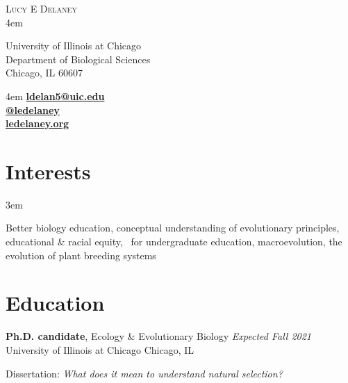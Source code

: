 \documentclass[]{article}
\begin{document}
\BgThispage
\pagestyle{alldocument}

{\fontsize{20}{64}\selectfont \textsc{Lucy E Delaney}}\\
\leftskip 4em
\begin{multicols}{2}

University of Illinois at Chicago\\
Department of Biological Sciences\\
Chicago, IL 60607

\columnbreak

\begin{flushright}
\rightskip 4em
\href{mailto:ldelan5@uic.edu}{\textbf{ldelan5@uic.edu}} \textcolor{light-gray}{\faPaperPlane}\\
\href{https://github.com/ledelaney}{\textbf{@ledelaney}} \textcolor{light-gray}{\faGithub}\\
\href{https://ledelaney.org}{\textbf{ledelaney.org}} \textcolor{light-gray}{\faDesktop}
\end{flushright}

\end{multicols}

\vspace{3mm}

\section{Interests}
\vspace{3mm}

\leftskip 3em

Better biology education, conceptual understanding of evolutionary principles, educational \& racial equity, \textcolor{light-gray}{\faRProject}\ for undergraduate education, macroevolution, the evolution of plant breeding systems

\vspace{3mm}
\section{Education}
\vspace{3mm}

\textbf{Ph.D. candidate}, Ecology \& Evolutionary Biology \hfill \textit{Expected Fall 2021}\\ 
University of Illinois at Chicago \hfill Chicago, IL
     
Dissertation: \emph{What does it mean to understand natural selection?} 
\vspace{0.3cm}
\end{document}
